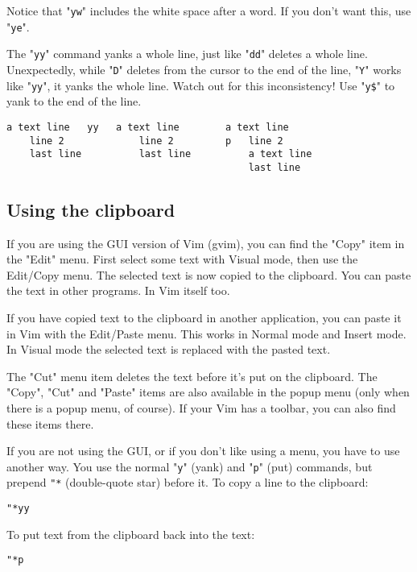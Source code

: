 Notice that "\texttt{yw}" includes the white space after a word.
If you don't want this, use "\texttt{ye}".

The "\texttt{yy}" command yanks a whole line, just like "\texttt{dd}" deletes a whole line.
Unexpectedly, while "\texttt{D}" deletes from the cursor to the end of the line, "\texttt{Y}" works like "\texttt{yy}", it yanks the whole line.
Watch out for this inconsistency!  Use "\texttt{y\$}" to yank to the end of the line.

		\begin{Verbatim}[samepage=true]
    a text line   yy   a text line        a text line
    line 2             line 2         p   line 2
    last line          last line          a text line
                                          last line
		\end{Verbatim}

\subsection{Using the clipboard}
\label{Using the clipboard}

If you are using the GUI version of Vim (gvim), you can find the "Copy" item in the "Edit" menu.
First select some text with Visual mode, then use the Edit/Copy menu.
The selected text is now copied to the clipboard.
You can paste the text in other programs.
In Vim itself too.

If you have copied text to the clipboard in another application, you can paste it in Vim with the Edit/Paste menu.
This works in Normal mode and Insert mode.
In Visual mode the selected text is replaced with the pasted text.

The "Cut" menu item deletes the text before it's put on the clipboard.
The "Copy", "Cut" and "Paste" items are also available in the popup menu (only when there is a popup menu, of course).
If your Vim has a toolbar, you can also find these items there.

If you are not using the GUI, or if you don't like using a menu, you have to use another way.
You use the normal "\texttt{y}" (yank) and "\texttt{p}" (put) commands, but prepend \texttt{"*} (double-quote star) before it.
To copy a line to the clipboard:

 \begin{Verbatim}[samepage=true]
 "*yy
 \end{Verbatim}

To put text from the clipboard back into the text:

 \begin{Verbatim}[samepage=true]
 "*p
 \end{Verbatim}

